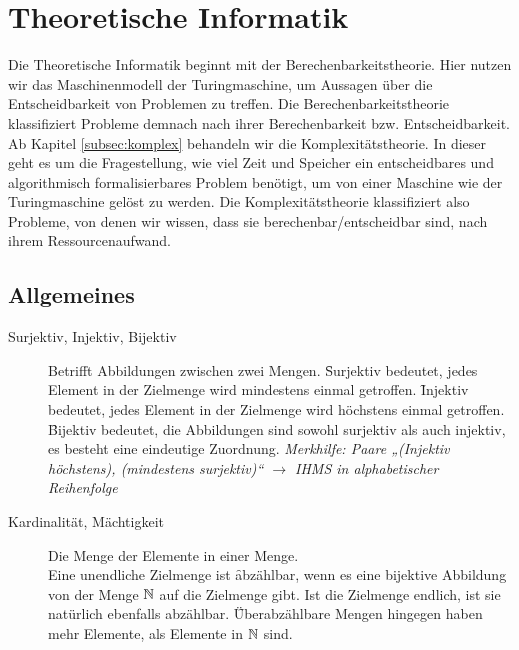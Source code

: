 \section{Theoretische Informatik}

Die Theoretische Informatik beginnt mit der Berechenbarkeitstheorie. Hier nutzen wir das Maschinenmodell der Turingmaschine, um Aussagen über die Entscheidbarkeit von Problemen zu treffen. Die Berechenbarkeitstheorie klassifiziert Probleme demnach nach ihrer Berechenbarkeit bzw. Entscheidbarkeit. \\

Ab Kapitel \ref{subsec:komplex} behandeln wir die Komplexitätstheorie. In dieser geht es um die Fragestellung, wie viel Zeit und Speicher ein entscheidbares und algorithmisch formalisierbares Problem benötigt, um von einer Maschine wie der Turingmaschine gelöst zu werden. Die Komplexitätstheorie klassifiziert also Probleme, von denen wir wissen, dass sie berechenbar/entscheidbar sind, nach ihrem Ressourcenaufwand.

\subsection{Allgemeines}
    \begin{description}
        \item[Surjektiv, Injektiv, Bijektiv] Betrifft Abbildungen zwischen zwei Mengen. \f{Surjektiv} bedeutet, jedes Element in der Zielmenge wird mindestens einmal getroffen. \f{Injektiv} bedeutet, jedes Element in der Zielmenge wird höchstens einmal getroffen. \f{Bijektiv} bedeutet, die Abbildungen sind sowohl surjektiv als auch injektiv, es besteht eine eindeutige Zuordnung. \textit{Merkhilfe: Paare „(Injektiv höchstens), (mindestens surjektiv)“ $\to$ IHMS in alphabetischer Reihenfolge}

        \item[Kardinalität, Mächtigkeit] Die Menge der Elemente in einer Menge. \\
            Eine unendliche Zielmenge ist \f{abzählbar}, wenn es eine bijektive Abbildung von der Menge $\mathbb{N}$ auf die Zielmenge gibt. Ist die Zielmenge endlich, ist sie natürlich ebenfalls abzählbar. \f{Überabzählbare} Mengen hingegen haben mehr Elemente, als Elemente in $\mathbb{N}$ sind.
    \end{description}

